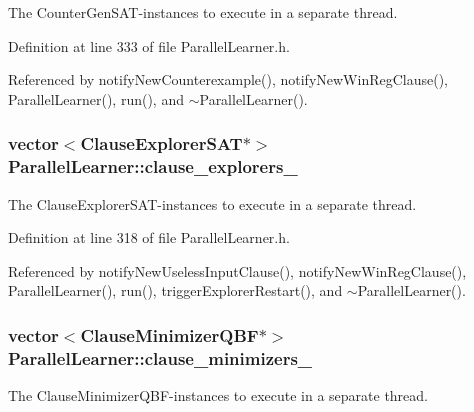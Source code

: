 The Counter\-Gen\-S\-A\-T-\/instances to execute in a separate thread. 



Definition at line 333 of file Parallel\-Learner.\-h.



Referenced by notify\-New\-Counterexample(), notify\-New\-Win\-Reg\-Clause(), Parallel\-Learner(), run(), and $\sim$\-Parallel\-Learner().

\hypertarget{classParallelLearner_a0e8b5dd12c8ae14089d3ce3117da3c16}{
\subsubsection[{clause\-\_\-explorers\-\_\-}]{\setlength{\rightskip}{0pt plus 5cm}vector$<${\bf Clause\-Explorer\-S\-A\-T}$\ast$$>$ Parallel\-Learner\-::clause\-\_\-explorers\-\_\-\hspace{0.3cm}{\ttfamily [protected]}}}\label{classParallelLearner_a0e8b5dd12c8ae14089d3ce3117da3c16}


The Clause\-Explorer\-S\-A\-T-\/instances to execute in a separate thread. 



Definition at line 318 of file Parallel\-Learner.\-h.



Referenced by notify\-New\-Useless\-Input\-Clause(), notify\-New\-Win\-Reg\-Clause(), Parallel\-Learner(), run(), trigger\-Explorer\-Restart(), and $\sim$\-Parallel\-Learner().

\hypertarget{classParallelLearner_adb5aa1e016e04c607073eaf90d994dc7}{
\subsubsection[{clause\-\_\-minimizers\-\_\-}]{\setlength{\rightskip}{0pt plus 5cm}vector$<${\bf Clause\-Minimizer\-Q\-B\-F}$\ast$$>$ Parallel\-Learner\-::clause\-\_\-minimizers\-\_\-\hspace{0.3cm}{\ttfamily [protected]}}}\label{classParallelLearner_adb5aa1e016e04c607073eaf90d994dc7}


The Clause\-Minimizer\-Q\-B\-F-\/instances to execute in a separate thread. 



